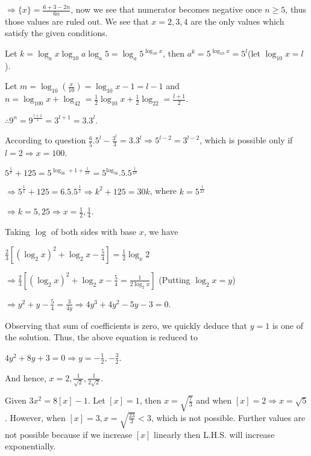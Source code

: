   $\Rightarrow \{x\} = \frac{6 + 3 - 2n}{6n}$, now we see that numerator becomes negative once $n \geq 5$,
  thus those values are ruled out. We see that $x = 2, 3, 4$ are the only values which satisfy the given
  conditions.
\item Let $k = \log_ax\log_{10}a\log_a5 = \log_a5^{\log_{10}x}$, then $a^k = 5^{\log_{10}x} = 5^l$(let
  $\log_{10}x = l$).

  Let $m = \log_{10}\left(\frac{x}{10}\right) = \log_{10}x - 1 = l - 1$ and $n = \log_{100}x + \log_42 =
  \frac{1}{2}\log_{10}x + \frac{1}{2}\log_22 = \frac{l + 1}{2}$.

  $\therefore 9^n = 9^{\frac{l + 1}{1}} = 3^{l + 1} = 3.3^l$.

  According to question $\frac{6}{5}.5^l - \frac{3^l}{3} = 3.3^l\Rightarrow 5^{l - 2} = 3^{l - 2}$, which is
  possible only if $l = 2 \Rightarrow x = 100$.
\item $5^{\frac{1}{x}} + 125 = 5^{\log_56 + 1 + \frac{1}{2x}} = 5^{\log_56}.5.5^{\frac{1}{2x}}$

  $\Rightarrow 5^{\frac{1}{x}} + 125 = 6.5.5^{\frac{1}{x}} \Rightarrow k^2 + 125 = 30k$, where $k =
  5^{\frac{1}{2x}}$

  $\Rightarrow k = 5, 25 \Rightarrow x = \frac{1}{2}, \frac{1}{4}$.
\item Taking $\log$ of both sides with base $x$, we have

  $\tfrac{2}{3}\left[(\log_2x)^2 + \log_2x - \tfrac{5}{4}\right] = \frac{1}{2}\log_x2$

  $\Rightarrow \frac{2}{3}\left[(\log_2x)^2 + \log_2x - \frac{5}{4} = \frac{1}{2\log_2x}\right]$ (Putting $\log_2x = y$)

  $\Rightarrow y^2 + y - \frac{5}{4} = \frac{3}{4y} \Rightarrow 4y^3 + 4y^2 - 5y - 3 = 0$.

  Observing that sum of coefficients is zero, we quickly deduce that $y = 1$ is one of the solution. Thus,
  the above equation is reduced to

  $4y^2 + 8y + 3 = 0 \Rightarrow y = -\frac{1}{2}, -\frac{3}{2}$.

  And hence, $x = 2, \frac{1}{\sqrt{2}}, \frac{1}{2\sqrt{2}}$.
\item Given $3x^2 = 8[x] - 1$. Let $[x] = 1$, then $x = \sqrt{\frac{7}{3}}$ and when $[x] = 2 \Rightarrow x
  = \sqrt{5}$. However, when $[x] = 3, x = \sqrt{\frac{23}{3}} < 3$, which is not possible. Further values
  are not possible because if we increase $[x]$ linearly then L.H.S. will increase exponentially.

